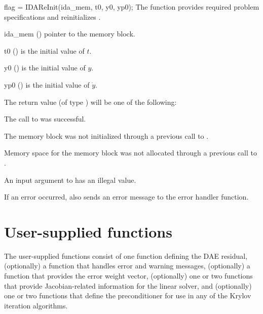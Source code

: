 {%
{
  flag = IDAReInit(ida\_mem, t0, y0, yp0);
}
{
  The function  provides required problem specifications
  and reinitializes {\ida}.
}
{
  \begin{args}
  \item[ida\_mem] ()
    pointer to the {\ida} memory block.
  \item[t0] ()
    is the initial value of $t$.
  \item[y0] ()
    is the initial value of $y$.
  \item[yp0] ()
    is the initial value of $\dot{y}$.
  \end{args}
}
{
  The return value  (of type ) will be one of the following:
  \begin{args}
  \item[\Id{IDA\_SUCCESS}]
    The call to  was successful.
  \item[\Id{IDA\_MEM\_NULL}]
    The {\ida} memory block was not initialized through a
    previous call to .
  \item[\Id{IDA\_NO\_MALLOC}]
    Memory space for the {\ida} memory block was not allocated through a
    previous call to .
  \item[\Id{IDA\_ILL\_INPUT}]
    An input argument to  has an illegal value.
  \end{args}
}
{
  If an error occurred,  also sends an error message to the
  error handler function.
}


\section{User-supplied functions}\label{ss:user_fct_sim}

The user-supplied functions consist of one function defining the DAE residual,
(optionally) a function that handles error and warning messages,
(optionally) a function that provides the error weight vector,
(optionally) one or two functions that provide Jacobian-related information for the linear
solver, and (optionally) one or two functions
that define the preconditioner for use in any of the Krylov iteration algorithms.
}

